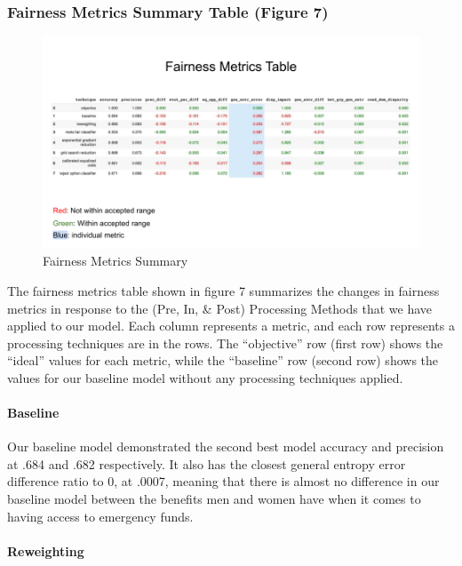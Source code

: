 \documentclass[water,article,submit,moreauthors,pdftex]{mdpi}
\begin{document}
\hypertarget{fairness-metrics-summary-table-figure-7}{%
\subsubsection{Fairness Metrics Summary Table (Figure
7)}\label{fairness-metrics-summary-table-figure-7}}

\begin{figure}
\centering
\includegraphics[width=\textwidth,height=0.4\textheight]{images/FairnessMetricsSummary.png}
\caption{Fairness Metrics Summary}
\end{figure}

The fairness metrics table shown in figure 7 summarizes the changes in
fairness metrics in response to the (Pre, In, \& Post) Processing
Methods that we have applied to our model. Each column represents a
metric, and each row represents a processing techniques are in the rows.
The ``objective'' row (first row) shows the ``ideal'' values for each
metric, while the ``baseline'' row (second row) shows the values for our
baseline model without any processing techniques applied.

\hypertarget{baseline}{%
\paragraph{Baseline}\label{baseline}}

Our baseline model demonstrated the second best model accuracy and
precision at .684 and .682 respectively. It also has the closest general
entropy error difference ratio to 0, at .0007, meaning that there is
almost no difference in our baseline model between the benefits men and
women have when it comes to having access to emergency funds.

\hypertarget{reweighting}{%
\paragraph{Reweighting}\label{reweighting}}
\end{document}

